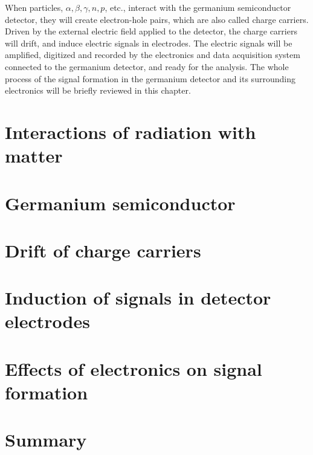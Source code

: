 When particles, $\alpha, \beta, \gamma, n, p$, etc., interact with the germanium semiconductor detector, they will create electron-hole pairs, which are also called charge carriers. Driven by the external electric field applied to the detector, the charge carriers will drift, and induce electric signals in electrodes. The electric signals will be amplified, digitized and recorded by the electronics and data acquisition system connected to the germanium detector, and ready for the analysis. The whole process of the signal formation in the germanium detector and its surrounding electronics will be briefly reviewed in this chapter.

\section{Interactions of radiation with matter}
\label{sec:det:phys}

\section{Germanium semiconductor}
\label{sec:det:semi}

\section{Drift of charge carriers}
\label{sec:det:drift}

\section{Induction of signals in detector electrodes}
\label{sec:det:lamo}

\section{Effects of electronics on signal formation}
\label{sec:det:elec}

\section{Summary}
\label{sec:det:sum}



